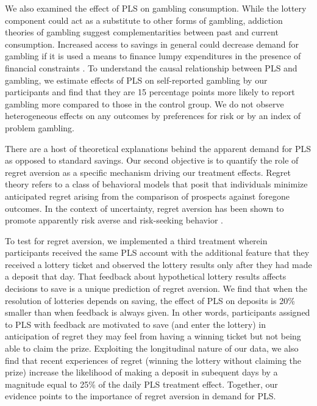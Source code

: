 \documentclass[11pt]{article}
\begin{document}
	We also examined the effect of PLS on gambling consumption. While the lottery component could act as a substitute to other forms of gambling, addiction theories of gambling \parencite{becker_theory_1988} suggest complementarities between past and current consumption. Increased access to savings in general could decrease demand for gambling if it is used a means to finance lumpy expenditures in the presence of financial constraints \parencite{herskowitz_gambling_2016}. To understand the causal relationship between PLS and gambling, we estimate effects of PLS on self-reported gambling by our participants and find that they are 15 percentage points more likely to report gambling more compared to those in the control group. We do not observe heterogeneous effects on any outcomes by preferences for risk or by an index of problem gambling.

	There are a host of theoretical explanations behind the apparent demand for PLS as opposed to standard savings. Our second objective is to quantify the role of regret aversion \parencite{bell_risk_1983,loomes_regret_1982} as a specific mechanism driving our treatment effects. Regret theory refers to a class of behavioral models that posit that individuals minimize anticipated regret arising from the comparison of prospects against foregone outcomes. In the context of uncertainty, regret aversion has been shown to promote apparently risk averse and risk-seeking behavior  \parencite{zeelenberg_consequences_1996}. 

	To test for regret aversion, we implemented a third treatment wherein participants received the same PLS account with the additional feature that they received a lottery ticket and observed the lottery results only after they had made a deposit that day. That feedback about hypothetical lottery results affects decisions to save is a unique prediction of regret aversion. We find that when the resolution of lotteries depends on saving, the effect of PLS on deposits is 20\% smaller than when feedback is always given. In other words, participants assigned to PLS with feedback are motivated to save (and enter the lottery) in anticipation of regret they may feel from having a winning ticket but not being able to claim the prize. Exploiting the longitudinal nature of our data, we also find that recent experiences of regret (winning the lottery without claiming the prize) increase the likelihood of making a deposit in subequent days by a magnitude equal to 25\% of the daily PLS treatment effect. Together, our evidence points to the importance of regret aversion in demand for PLS.
\end{document}
